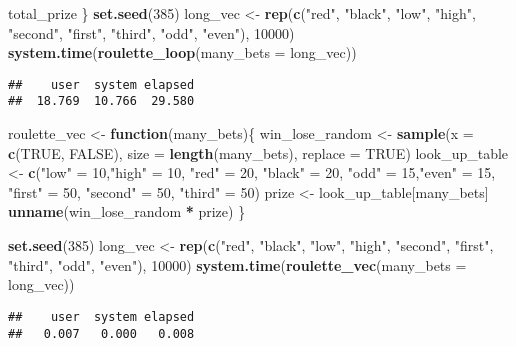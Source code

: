 \documentclass[]{article}
\newenvironment{Shaded}{\begin{snugshade}}{\end{snugshade}}
\newcommand{\ControlFlowTok}[1]{\textcolor[rgb]{0.13,0.29,0.53}{\textbf{#1}}}
\newcommand{\DataTypeTok}[1]{\textcolor[rgb]{0.13,0.29,0.53}{#1}}
\newcommand{\DecValTok}[1]{\textcolor[rgb]{0.00,0.00,0.81}{#1}}
\newcommand{\KeywordTok}[1]{\textcolor[rgb]{0.13,0.29,0.53}{\textbf{#1}}}
\newcommand{\NormalTok}[1]{#1}
\newcommand{\OperatorTok}[1]{\textcolor[rgb]{0.81,0.36,0.00}{\textbf{#1}}}
\newcommand{\OtherTok}[1]{\textcolor[rgb]{0.56,0.35,0.01}{#1}}
\newcommand{\StringTok}[1]{\textcolor[rgb]{0.31,0.60,0.02}{#1}}
\begin{document}
\begin{Shaded}
\begin{Highlighting}[]
\NormalTok{  total_prize}
\NormalTok{\}}
\KeywordTok{set.seed}\NormalTok{(}\DecValTok{385}\NormalTok{)}
\NormalTok{long_vec <-}\StringTok{ }\KeywordTok{rep}\NormalTok{(}\KeywordTok{c}\NormalTok{(}\StringTok{"red"}\NormalTok{, }\StringTok{"black"}\NormalTok{, }\StringTok{"low"}\NormalTok{, }\StringTok{"high"}\NormalTok{, }\StringTok{"second"}\NormalTok{, }\StringTok{"first"}\NormalTok{, }\StringTok{"third"}\NormalTok{,}
                  \StringTok{"odd"}\NormalTok{, }\StringTok{"even"}\NormalTok{), }\DecValTok{10000}\NormalTok{)}
\KeywordTok{system.time}\NormalTok{(}\KeywordTok{roulette_loop}\NormalTok{(}\DataTypeTok{many_bets =}\NormalTok{ long_vec))}
\end{Highlighting}
\end{Shaded}

\begin{verbatim}
##    user  system elapsed 
##  18.769  10.766  29.580
\end{verbatim}

\begin{Shaded}
\begin{Highlighting}[]
\NormalTok{roulette_vec <-}\StringTok{ }\ControlFlowTok{function}\NormalTok{(many_bets)\{}
\NormalTok{  win_lose_random <-}\StringTok{ }\KeywordTok{sample}\NormalTok{(}\DataTypeTok{x =} \KeywordTok{c}\NormalTok{(}\OtherTok{TRUE}\NormalTok{, }\OtherTok{FALSE}\NormalTok{), }\DataTypeTok{size =} \KeywordTok{length}\NormalTok{(many_bets),}
                            \DataTypeTok{replace =} \OtherTok{TRUE}\NormalTok{)}
\NormalTok{  look_up_table <-}\StringTok{ }\KeywordTok{c}\NormalTok{(}\StringTok{"low"}\NormalTok{ =}\StringTok{ }\DecValTok{10}\NormalTok{,}\StringTok{"high"}\NormalTok{ =}\StringTok{ }\DecValTok{10}\NormalTok{, }\StringTok{"red"}\NormalTok{ =}\StringTok{ }\DecValTok{20}\NormalTok{, }\StringTok{"black"}\NormalTok{ =}\StringTok{ }\DecValTok{20}\NormalTok{, }\StringTok{"odd"}\NormalTok{ =}\StringTok{   }\DecValTok{15}\NormalTok{,}\StringTok{"even"}\NormalTok{ =}\StringTok{ }\DecValTok{15}\NormalTok{,}
                     \StringTok{"first"}\NormalTok{ =}\StringTok{ }\DecValTok{50}\NormalTok{, }\StringTok{"second"}\NormalTok{ =}\StringTok{ }\DecValTok{50}\NormalTok{, }\StringTok{"third"}\NormalTok{ =}\StringTok{ }\DecValTok{50}\NormalTok{)}
\NormalTok{  prize <-}\StringTok{ }\NormalTok{look_up_table[many_bets]}
  \KeywordTok{unname}\NormalTok{(win_lose_random }\OperatorTok{*}\StringTok{ }\NormalTok{prize)}
\NormalTok{\}}


\KeywordTok{set.seed}\NormalTok{(}\DecValTok{385}\NormalTok{)}
\NormalTok{long_vec <-}\StringTok{ }\KeywordTok{rep}\NormalTok{(}\KeywordTok{c}\NormalTok{(}\StringTok{"red"}\NormalTok{, }\StringTok{"black"}\NormalTok{, }\StringTok{"low"}\NormalTok{, }\StringTok{"high"}\NormalTok{, }\StringTok{"second"}\NormalTok{, }\StringTok{"first"}\NormalTok{, }\StringTok{"third"}\NormalTok{,}
                  \StringTok{"odd"}\NormalTok{, }\StringTok{"even"}\NormalTok{), }\DecValTok{10000}\NormalTok{)}
\KeywordTok{system.time}\NormalTok{(}\KeywordTok{roulette_vec}\NormalTok{(}\DataTypeTok{many_bets =}\NormalTok{ long_vec))}
\end{Highlighting}
\end{Shaded}

\begin{verbatim}
##    user  system elapsed 
##   0.007   0.000   0.008
\end{verbatim}
\end{document}
